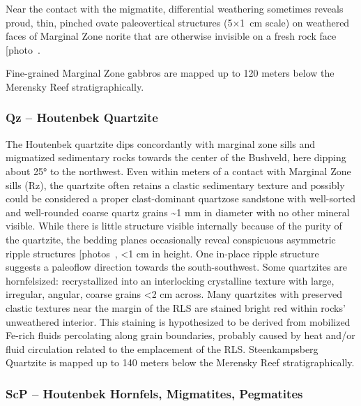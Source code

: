 Near the contact with the migmatite, differential weathering sometimes
reveals proud, thin, pinched ovate paleovertical structures (5$\times$1~cm
scale) on weathered faces of Marginal Zone norite that are otherwise
invisible on a fresh rock face {[}photo~\ChFivePhoto{40}{]}.


Fine-grained Marginal Zone gabbros are mapped up to 120 meters below the
Merensky Reef stratigraphically.

\subsubsection{Qz -- Houtenbek Quartzite}
\label{sec:ch5-unit-qz}

The Houtenbek quartzite dips concordantly with marginal zone sills and
migmatized sedimentary rocks towards the center of the Bushveld, here
dipping about 25° to the northwest. Even within meters of a contact with
Marginal Zone sills (Rz), the quartzite often retains a clastic
sedimentary texture and possibly could be considered a proper
clast-dominant quartzose sandstone with well-sorted and well-rounded
coarse quartz grains \textasciitilde1 mm in diameter with no other
mineral visible. While there is little structure visible internally
because of the purity of the quartzite, the bedding planes occasionally
reveal conspicuous asymmetric ripple structures {[}photos~, \ChFivePhoto{68}{]}
\textless1 cm in height. One in-place ripple structure suggests a
paleoflow direction towards the south-southwest. Some quartzites are
hornfelsized: recrystallized into an interlocking crystalline texture
with large, irregular, angular, coarse grains \textless2 cm across. Many
quartzites with preserved clastic textures near the margin of the RLS
are stained bright red within rocks' unweathered interior. This staining
is hypothesized to be derived from mobilized Fe-rich fluids percolating
along grain boundaries, probably caused by heat and/or fluid circulation
related to the emplacement of the RLS. Steenkampsberg Quartzite is mapped
up to 140 meters below the Merensky Reef stratigraphically.

\subsubsection{ScP -- Houtenbek Hornfels, Migmatites, Pegmatites}
\label{sec:ch5-unit-scp}

